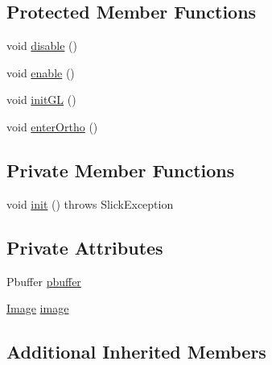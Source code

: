 \subsection*{Protected Member Functions}
\begin{DoxyCompactItemize}
\item 
void \mbox{\hyperlink{classorg_1_1newdawn_1_1slick_1_1opengl_1_1pbuffer_1_1_p_buffer_graphics_accaf011f21a36aee2ca471a9c40d441f}{disable}} ()
\item 
void \mbox{\hyperlink{classorg_1_1newdawn_1_1slick_1_1opengl_1_1pbuffer_1_1_p_buffer_graphics_af8acbb10f795d56cf003552cff5c6278}{enable}} ()
\item 
void \mbox{\hyperlink{classorg_1_1newdawn_1_1slick_1_1opengl_1_1pbuffer_1_1_p_buffer_graphics_ade988e7cf903a9960068b18589c6474b}{init\+GL}} ()
\item 
void \mbox{\hyperlink{classorg_1_1newdawn_1_1slick_1_1opengl_1_1pbuffer_1_1_p_buffer_graphics_af2b72d6f76bcd53819c64eaa0bbe92f5}{enter\+Ortho}} ()
\end{DoxyCompactItemize}
\subsection*{Private Member Functions}
\begin{DoxyCompactItemize}
\item 
void \mbox{\hyperlink{classorg_1_1newdawn_1_1slick_1_1opengl_1_1pbuffer_1_1_p_buffer_graphics_ae65c7b96c583158f68e1de6636f961ba}{init}} ()  throws Slick\+Exception 
\end{DoxyCompactItemize}
\subsection*{Private Attributes}
\begin{DoxyCompactItemize}
\item 
Pbuffer \mbox{\hyperlink{classorg_1_1newdawn_1_1slick_1_1opengl_1_1pbuffer_1_1_p_buffer_graphics_a47f309800a09ac31cb98a42398dd7e7d}{pbuffer}}
\item 
\mbox{\hyperlink{classorg_1_1newdawn_1_1slick_1_1_image}{Image}} \mbox{\hyperlink{classorg_1_1newdawn_1_1slick_1_1opengl_1_1pbuffer_1_1_p_buffer_graphics_add068041cc793fa55a4019603b988d72}{image}}
\end{DoxyCompactItemize}
\subsection*{Additional Inherited Members}


